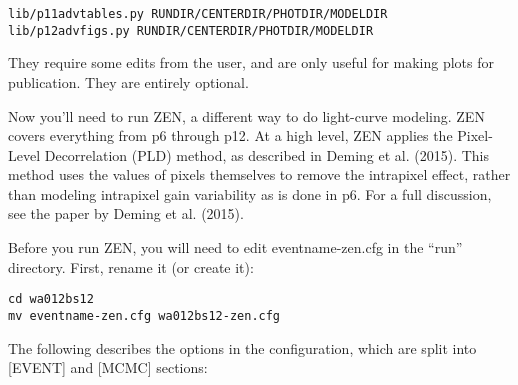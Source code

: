 \documentclass[letterpaper,12pt]{article}
\begin{document}
\begin{verbatim}
lib/p11advtables.py RUNDIR/CENTERDIR/PHOTDIR/MODELDIR
lib/p12advfigs.py RUNDIR/CENTERDIR/PHOTDIR/MODELDIR
\end{verbatim}

They require some edits from the user, and are only useful for making
plots for publication. They are entirely optional.

Now you'll need to run ZEN, a different way to do light-curve
modeling.  ZEN covers everything from p6 through p12. At a high
level, ZEN applies the Pixel-Level Decorrelation (PLD) method,
as described in Deming et al. (2015). This method uses the values
of pixels themselves to remove the intrapixel effect, rather than
modeling intrapixel gain variability as is done in p6. For a full
discussion, see the paper by Deming et al. (2015).

Before you run ZEN, you will need to edit eventname-zen.cfg in the ``run''
directory. First, rename it (or create it):

\begin{verbatim}
cd wa012bs12
mv eventname-zen.cfg wa012bs12-zen.cfg
\end{verbatim}

The following describes the options in the configuration, which are
split into [EVENT] and [MCMC] sections:
\end{document}
